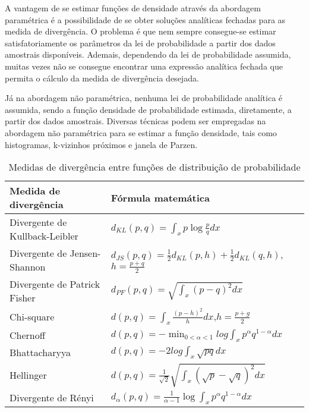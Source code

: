 A vantagem de se estimar funções de densidade através da abordagem paramétrica é a possibilidade de se obter soluções analíticas fechadas para as medida de divergência. O problema é que nem sempre consegue-se estimar satisfatoriamente os parâmetros da lei de probabilidade a partir dos dados amostrais disponíveis. Ademais, dependendo da lei de probabilidade assumida, muitas vezes não se consegue encontrar uma expressão analítica fechada que permita o cálculo da medida de divergência desejada.

Já na abordagem não paramétrica, nenhuma lei de probabilidade analítica é assumida, sendo a função densidade de probabilidade estimada, diretamente, a partir dos dados amostrais. Diversas técnicas podem ser empregadas na abordagem não paramétrica para se estimar a função densidade, tais como histogramas, k-vizinhos próximos e janela de Parzen.  

\begin{table}
\centering
\caption{\label{tbl:cont_div}Medidas de divergência entre funções de distribuição de probabilidade}
\begin{tabular}[]{ll}
\hline
Medida de divergência&Fórmula matemática\\
\hline
Divergente de Kullback-Leibler&$d_{KL}(p,q) = \int_{x} p\log{\frac{p}{q}}dx$\\
Divergente de Jensen-Shannon&$d_{JS}(p,q) =\frac{1}{2}d_{KL}(p,h)+\frac{1}{2}d_{KL}(q,h)$, $h = \frac{p+q}{2}$\\
Divergente de Patrick Fisher&$d_{PF}(p,q) = \sqrt{\int_{x}{(p-q)}^2dx}$\\
Chi-square&$d(p,q)= \int_{x}{\frac{(p-h)^2}{h}dx}$,$h = \frac{p + g}{2}$\\
Chernoff&$\displaystyle d(p,q) = - \min_{0<\alpha<1}{log{\int_{x}{p^{\alpha}q^{1-\alpha}}dx}}$\\
Bhattacharyya&$d(p,q) = -2log{\int_{x}{\sqrt{pq}dx}}$\\
Hellinger&$d(p,q)=\frac{1}{\sqrt{2}}\sqrt{\int_{x}{(\sqrt{p}-\sqrt{q})^2dx}}$\\
Divergente de Rényi&$d_{\alpha}(p,q) =\frac{1}{\alpha-1}\log{\int_{x}{p^{\alpha}q^{1-\alpha}}dx}$\\
\hline
\end{tabular}
\end{table}


